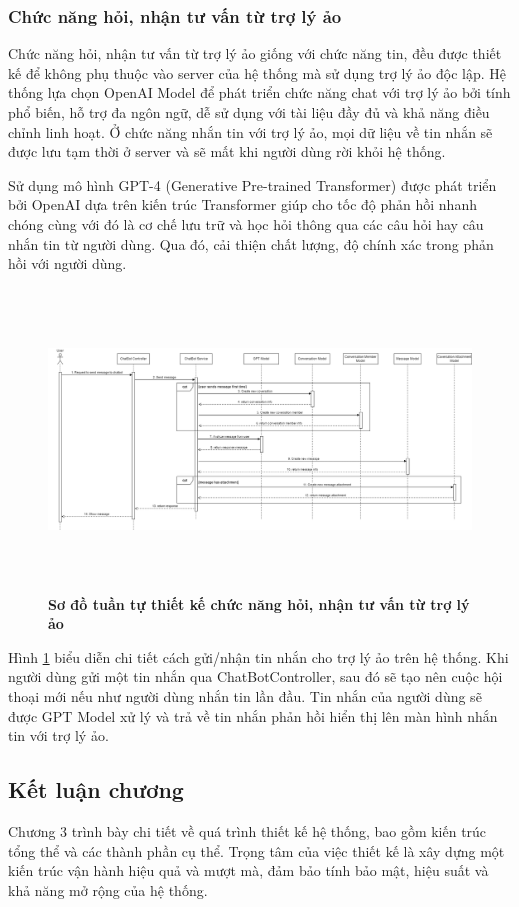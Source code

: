 \subsubsection{Chức năng hỏi, nhận tư vấn từ trợ lý ảo}
Chức năng hỏi, nhận tư vấn từ trợ lý ảo giống với chức năng tin, đều được thiết kế để không phụ thuộc vào server của
hệ thống mà sử dụng trợ lý ảo độc lập. Hệ thống lựa chọn OpenAI Model để phát triển
chức năng chat với trợ lý ảo bởi tính phổ biến, hỗ trợ đa ngôn ngữ, dễ sử dụng với tài liệu đầy
đủ và khả năng điều chỉnh linh hoạt. Ở chức năng nhắn tin với trợ lý ảo, mọi dữ liệu về tin nhắn sẽ được lưu tạm thời ở 
server và sẽ mất khi người dùng rời khỏi hệ thống.

Sử dụng mô hình GPT-4 (Generative Pre-trained Transformer) được phát triển bởi OpenAI dựa trên kiến trúc Transformer giúp 
cho tốc độ phản hồi nhanh chóng cùng với đó là cơ chế lưu trữ và học hỏi thông qua các câu hỏi hay câu nhắn tin từ người dùng. 
Qua đó, cải thiện chất lượng, độ chính xác trong phản hồi với người dùng.

\begin{figure}[H]
  \centering
  \includegraphics[width=16cm,height=8cm]{Images/sequence_api/sendMessageChatBot.png}
  \caption[Sơ đồ tuần tự thiết kế chức năng hỏi, nhận tư vấn từ trợ lý ảo]{\bfseries \fontsize{12pt}{0pt}
  \selectfont Sơ đồ tuần tự thiết kế chức năng hỏi, nhận tư vấn từ trợ lý ảo}
  \label{api_sendMessageChatBot} %
\end{figure}
Hình \ref{api_sendMessageChatBot} biểu diễn chi tiết cách gửi/nhận tin nhắn cho trợ lý ảo trên hệ thống. Khi người dùng gửi một tin nhắn qua ChatBotController, sau đó sẽ tạo nên cuộc hội thoại mới nếu như người dùng nhắn tin lần đầu. 
Tin nhắn của người dùng sẽ được GPT Model xử lý và trả về tin nhắn phản hồi hiển thị lên màn hình nhắn tin với trợ lý ảo.
\subsection{Kết luận chương}

Chương 3 trình bày chi tiết về quá trình thiết kế hệ thống, bao gồm kiến trúc tổng thể và các thành phần cụ thể. 
Trọng tâm của việc thiết kế là xây dựng một kiến trúc vận hành hiệu quả và mượt mà, đảm bảo tính bảo mật, hiệu suất 
và khả năng mở rộng của hệ thống.

\newpage